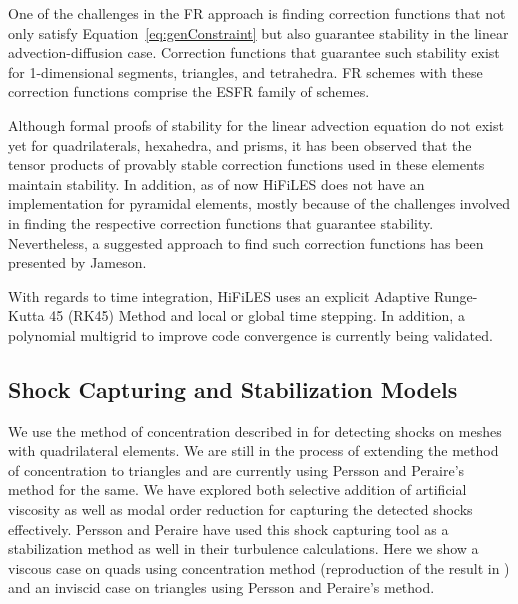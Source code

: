 One of the challenges in the FR approach is finding correction functions that not only satisfy Equation~\eqref{eq:genConstraint} but also guarantee stability in the linear advection-diffusion case. Correction functions that guarantee such stability exist for 1-dimensional segments\cite{vincent2011new}, triangles\cite{castonguay2012new,williams2013tri}, and tetrahedra\cite{williams2013tet}. FR schemes with these correction functions comprise the ESFR family of schemes.

Although formal proofs of stability for the linear advection equation do not exist yet for quadrilaterals, hexahedra, and prisms, it has been observed that the tensor products of provably stable correction functions used in these elements maintain stability. In addition, as of now HiFiLES does not have an implementation for pyramidal elements, mostly because of the challenges involved in finding the respective correction functions that guarantee stability. Nevertheless, a suggested approach to find such correction functions has been presented by Jameson\cite{jameson2011advances}.

With regards to time integration, HiFiLES uses an explicit Adaptive Runge-Kutta 45 (RK45) Method and local or global time stepping. In addition, a polynomial multigrid to improve code convergence is currently being validated.

\subsection{Shock Capturing and Stabilization Models}

We use the method of concentration described in \cite{abhishekshockcapture} for detecting shocks on meshes with quadrilateral elements. We are still in the process of extending the method of concentration to triangles and are currently using Persson and Peraire's method \cite{Persson06} \cite{Persson13} for the same. We have explored both selective addition of artificial viscosity as well as modal order reduction for capturing the detected shocks effectively. Persson and Peraire have used this shock capturing tool as a stabilization method as well in their turbulence calculations. Here we show a viscous case on quads using concentration method (reproduction of the result in \cite{abhishekshockcapture}) and an inviscid case on triangles using Persson and Peraire's method. \\

